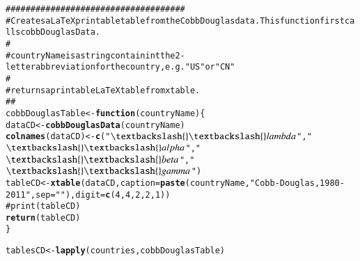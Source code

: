 \documentclass[preprint,authoryear,12pt]{elsarticle}\usepackage{graphicx, color}
\makeatletter
\newcommand{\hlfunctioncall}[1]{\textcolor[rgb]{0.501960784313725,0,0.329411764705882}{\textbf{#1}}}%
\newcommand{\hlstring}[1]{\textcolor[rgb]{0.6,0.6,1}{#1}}%
\newcommand{\hlcomment}[1]{\textcolor[rgb]{0.180392156862745,0.6,0.341176470588235}{#1}}%
\newenvironment{kframe}{%
 \def\at@end@of@kframe{}%
 \ifinner\ifhmode%
  \def\at@end@of@kframe{\end{minipage}}%
  \begin{minipage}{\columnwidth}%
 \fi\fi%
 \def\FrameCommand##1{\hskip\@totalleftmargin \hskip-\fboxsep
 \colorbox{shadecolor}{##1}\hskip-\fboxsep
     \hskip-\linewidth \hskip-\@totalleftmargin \hskip\columnwidth}%
 \MakeFramed {\advance\hsize-\width
   \@totalleftmargin\z@ \linewidth\hsize
   \@setminipage}}%
 {\par\unskip\endMakeFramed%
 \at@end@of@kframe}
\newenvironment{knitrout}{}{} %
\makeatother
\begin{document}
\begin{knitrout}
\begin{kframe}
\begin{alltt}
\hlcomment{####################################}
\hlcomment{# Creates a LaTeX printable table from the Cobb Douglas data. This function first calls cobbDouglasData.}
\hlcomment{#}
\hlcomment{# countryName is a string containint the 2-letter abbreviation for the country, e.g. "US" or "CN"}
\hlcomment{#}
\hlcomment{# returns a printable LaTeX table from xtable.}
\hlcomment{##}
cobbDouglasTable <- \hlfunctioncall{function}(countryName)\{
  dataCD <- \hlfunctioncall{cobbDouglasData}(countryName) 
  \hlfunctioncall{colnames}(dataCD) <- \hlfunctioncall{c}(\hlstring{"$\textbackslash{}\textbackslash{}lambda$"}, \hlstring{"$\textbackslash{}\textbackslash{}alpha$"}, \hlstring{"$\textbackslash{}\textbackslash{}beta$"}, \hlstring{"$\textbackslash{}\textbackslash{}gamma$"})
  tableCD <- \hlfunctioncall{xtable}(dataCD, caption=\hlfunctioncall{paste}(countryName, \hlstring{" Cobb-Douglas, 1980-2011"}, sep=\hlstring{""}), digit = \hlfunctioncall{c}(4, 4, 2, 2, 1))
\hlcomment{  #print(tableCD)}
  \hlfunctioncall{return}(tableCD)  
\}
\end{alltt}
\end{kframe}
\end{knitrout}


\begin{knitrout}
\color{fgcolor}\begin{kframe}
\begin{alltt}
tablesCD <- \hlfunctioncall{lapply}(countries, cobbDouglasTable)
\end{alltt}


{\ttfamily\noindent\itshape\color{messagecolor}{Waiting for profiling to be done...}}

{\ttfamily\noindent\itshape\color{messagecolor}{Waiting for profiling to be done...}}\end{kframe}
\end{knitrout}
\end{document}
